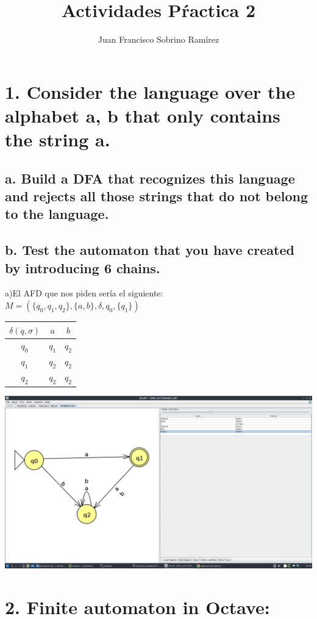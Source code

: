 \documentclass[20pt,oneside]{extbook}
\title{\Huge {Actividades Pŕactica 2}}
\author{Juan Francisco Sobrino Ramírez}
\date{}
\begin{document}
\maketitle

\newpage 
\section*{1. Consider the language over the alphabet {a, b} that only contains the string a.}
\subsection*{a. Build a DFA that recognizes this language and rejects all those strings that
do not belong to the language.\\
\\b. Test the automaton that you have created by introducing 6 chains.\\}


a)El AFD que nos piden sería el siguiente:\\

$M=(\{q_0,q_1,q_2\}, \{a,b\}, \delta, q_0, \{q_1\})$ \\
\begin{table}[h!]
\begin{tabular}{c|c|c}
  $\delta(q,\sigma)$ & $a$ & $b$\\
  \hline
  $q_0$& $q_1$ & $q_2$\\
  \hline
  $q_1$& $q_2$ & $q_2$\\
  \hline
  $q_2$& $q_2$ & $q_2$
\end{tabular}
\end{table}



\includegraphics[scale=0.5]{DFA_ACTIVIDAD1}

\section*{2. Finite automaton in Octave:}
\end{document}
